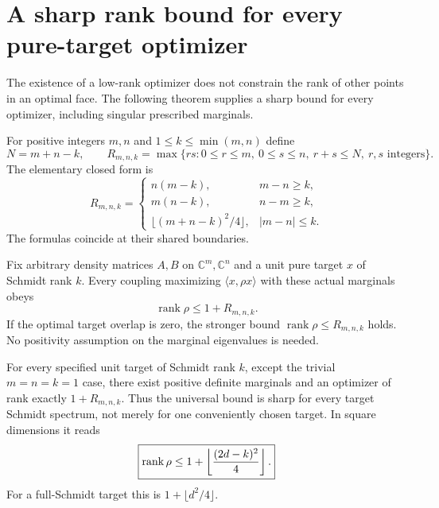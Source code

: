 \section{A sharp rank bound for every pure-target optimizer}
\label{sec:all-optimizer-rank}

The existence of a low-rank optimizer does not constrain the rank of other
points in an optimal face. The following theorem supplies a sharp bound for
every optimizer, including singular prescribed marginals.

For positive integers $m,n$ and $1\le k\le\min(m,n)$ define
\[
 N=m+n-k,\qquad
 R_{m,n,k}=\max\{rs:0\le r\le m,\ 0\le s\le n,\ r+s\le N,
                  \ r,s\text{ integers}\}.
\]
The elementary closed form is
\[
 R_{m,n,k}=
 \begin{cases}
 n(m-k),&m-n\ge k,\\
 m(n-k),&n-m\ge k,\\
 \lfloor(m+n-k)^2/4\rfloor,&|m-n|\le k.
 \end{cases}
\]
The formulas coincide at their shared boundaries.

\begin{theorem}
\label{thm:all-optimizer-rank}
Fix arbitrary density matrices $A,B$ on $\mathbb C^m,\mathbb C^n$ and a
unit pure target $x$ of Schmidt rank $k$. Every coupling maximizing
$\langle x,\rho x\rangle$ with these actual marginals obeys
\[
                  \boxed{\operatorname{rank}\rho\le1+R_{m,n,k}.}
\]
If the optimal target overlap is zero, the stronger bound
$\operatorname{rank}\rho\le R_{m,n,k}$ holds. No positivity assumption
on the marginal eigenvalues is needed.

For every specified unit target of Schmidt rank $k$, except the trivial
$m=n=k=1$ case, there exist positive definite marginals and an optimizer
of rank exactly $1+R_{m,n,k}$. Thus the universal bound is sharp for every
target Schmidt spectrum, not merely for one conveniently chosen target.
In square dimensions it reads
\[
 \boxed{\operatorname{rank}\rho\le
       1+\left\lfloor{(2d-k)^2\over4}\right\rfloor.}
\]
For a full-Schmidt target this is $1+\lfloor d^2/4\rfloor$.
\end{theorem}


